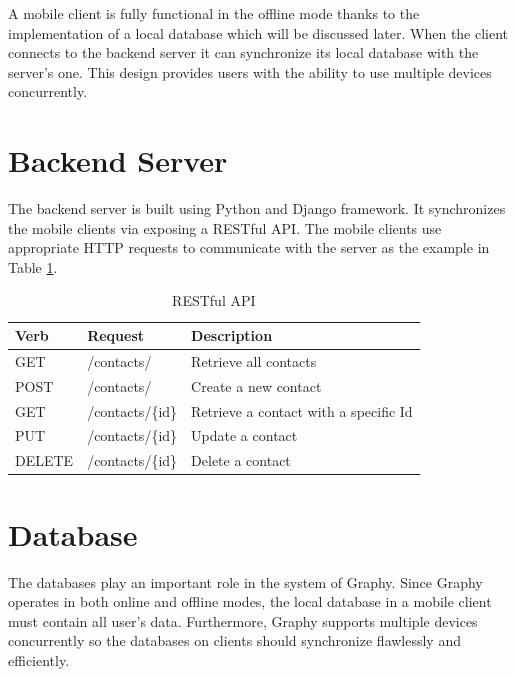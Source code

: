 A mobile client is fully functional in the offline mode thanks to the implementation of a local database which will be discussed later. When the client connects to the backend server it can synchronize its local database with the server's one. This design provides users with the ability to use multiple devices concurrently.

\section{Backend Server}
The backend server is built using Python and Django framework. It synchronizes the mobile clients via exposing a RESTful API. The mobile clients use appropriate HTTP requests to communicate with the server as the example in Table \ref{tb:restapi}.

\begin{table}[!ht]
\centering
\caption{RESTful API}\label{tb:restapi}
\begin{tabular}{| l | l | p{3.5cm} |} \hline
\textbf{Verb} & \textbf{Request} & \textbf{Description}\\ \hline
GET & /contacts/ & Retrieve all contacts\\ \hline
POST & /contacts/ & Create a new contact\\ \hline
GET & /contacts/\{id\} & Retrieve a contact with a specific Id\\ \hline
PUT & /contacts/\{id\} & Update a contact\\ \hline
DELETE & /contacts/\{id\} & Delete a contact\\ \hline
\end{tabular}
\end{table}


\section{Database}
The databases play an important role in the system of Graphy. Since Graphy operates in both online and offline modes, the local database in a mobile client must contain all user's data. Furthermore, Graphy supports multiple devices concurrently so the databases on clients should synchronize flawlessly and efficiently.

